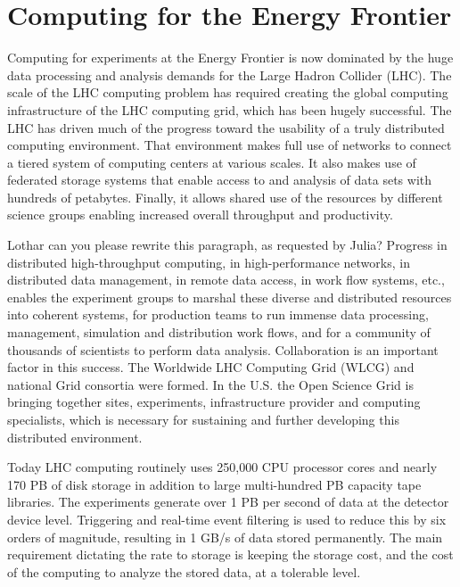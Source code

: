\section{Computing for the Energy Frontier}

Computing for experiments at the Energy Frontier is now dominated by
the huge data processing and analysis demands for the Large Hadron Collider
(LHC). The scale of the LHC computing problem has required creating the
global computing infrastructure of the LHC computing grid, which has been
hugely successful.  The LHC has driven much of the progress toward the
usability of a truly distributed computing environment. 
That environment makes full use of
networks to connect a tiered system of computing centers at various scales. 
It also makes use of
federated storage systems that enable access to and analysis of 
data sets with hundreds of petabytes. 
Finally, it allows shared use of the resources by different science groups
enabling increased overall throughput and productivity.

{\color{red} Lothar can you please rewrite this paragraph, as requested by Julia?}
Progress in distributed high-throughput computing, in high-performance
networks, in distributed data management, in remote data access, in work flow
systems, etc., enables the experiment groups to marshal these diverse and
distributed resources into coherent systems, for production teams to run
immense data processing, management, simulation and distribution work flows,
and for a community of thousands of scientists to perform data analysis.
Collaboration is an important factor in this success. The Worldwide LHC
Computing Grid (WLCG)  and national Grid consortia were formed. In the U.S.
the Open Science Grid is  bringing together sites, experiments, infrastructure
provider and computing specialists, which is necessary for  sustaining and
further developing this distributed environment.

Today LHC computing routinely uses 250,000 CPU processor cores and nearly 170
PB of disk storage in addition to large multi-hundred PB capacity
tape libraries.  The experiments generate over 1 PB per second of data
at the detector device level. Triggering and real-time event filtering  is
used to reduce this by six orders of magnitude, resulting in 1 GB/s of data
stored permanently. 
The main requirement dictating the rate to
storage is keeping the storage cost, and the  cost of the computing to analyze
the stored data, at a tolerable level.

